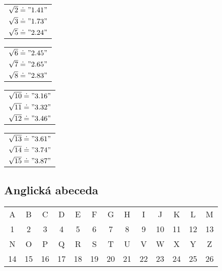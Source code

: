 \documentclass[vyfuk,\classoptions]{fksgeneric}
\begin{document}
\begin{framed}
\begin{multicols}{4}

\begin{center}
\begin{tabular}{l}
$\sqrt{2} \doteq "1.41"$\\
$\sqrt{3} \doteq "1.73"$\\
$\sqrt{5} \doteq "2.24"$
\end{tabular}
\end{center}

\columnbreak

\begin{center}
\begin{tabular}{l}
$\sqrt{6} \doteq "2.45"$\\
$\sqrt{7} \doteq "2.65"$\\
$\sqrt{8} \doteq "2.83"$
\end{tabular}
\end{center}

\columnbreak

\begin{center}
\begin{tabular}{l}
$\sqrt{10} \doteq "3.16"$\\
$\sqrt{11} \doteq "3.32"$\\
$\sqrt{12} \doteq "3.46"$\\
\end{tabular}
\end{center}

\columnbreak

\begin{center}
\begin{tabular}{l}
$\sqrt{13} \doteq "3.61"$\\
$\sqrt{14} \doteq "3.74"$\\
$\sqrt{15} \doteq "3.87"$\\
\end{tabular}
\end{center}

\end{multicols}\vspace{-\baselineskip}
\end{framed}

\subsection{Anglická abeceda}

\begin{framed}
\begin{center}
\begin{tabular}{ccccccccccccc}
A & B & C & D & E & F & G & H & I & J & K & L & M\\
1 & 2 & 3 & 4 & 5 & 6 & 7 & 8 & 9 & 10 & 11 & 12 & 13\\
\midrule
N & O & P & Q & R & S & T & U & V & W & X & Y & Z\\
14 & 15 & 16 & 17 & 18 & 19 & 20 & 21 & 22 & 23 & 24 & 25 & 26
\end{tabular}
\end{center}
\end{framed}
\end{document}
